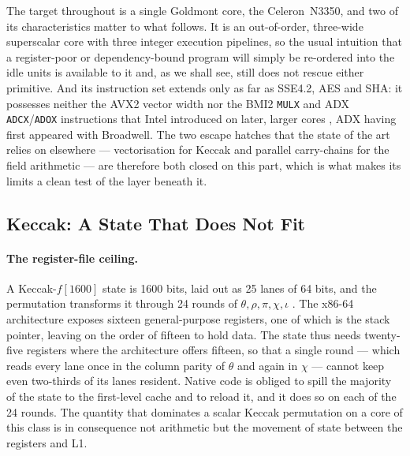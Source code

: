 The target throughout is a single Goldmont core, the \hbox{Celeron~N3350}, and
two of its characteristics matter to what follows. It is an out-of-order,
three-wide superscalar core with three integer execution pipelines, so the usual
intuition that a register-poor or dependency-bound program will simply be
re-ordered into the idle units is available to it and, as we shall see, still
does not rescue either primitive. And its instruction set extends only as far as
SSE4.2, AES and SHA: it possesses neither the AVX2 vector width nor the BMI2
\texttt{MULX} and ADX \texttt{ADCX}/\texttt{ADOX} instructions that Intel
introduced on later, larger cores \cite{intelLargeIntegerArithmetic2012}, ADX
having first appeared with Broadwell. The two escape hatches that the state of
the art relies on elsewhere --- vectorisation for Keccak and parallel
carry-chains for the field arithmetic --- are therefore both closed on this part,
which is what makes its limits a clean test of the layer beneath it.

\subsection{Keccak: A State That Does Not Fit}
\label{sec:challenge-keccak}

\paragraph{The register-file ceiling.}
A Keccak-$f[1600]$ state is 1600 bits, laid out as 25 lanes of 64 bits, and the
permutation transforms it through 24 rounds of $\theta,\rho,\pi,\chi,\iota$
\cite{bertoniKeccakReference2011,technologySHA32015}. The x86-64 architecture exposes
sixteen general-purpose registers, one of which is the stack pointer, leaving on
the order of fifteen to hold data. The state thus needs twenty-five registers
where the architecture offers fifteen, so that a single round --- which reads
every lane once in the column parity of $\theta$ and again in $\chi$ --- cannot
keep even two-thirds of its lanes resident. Native code is obliged to spill the
majority of the state to the first-level cache and to reload it, and it does so on
each of the 24 rounds. The quantity that dominates a scalar Keccak permutation on
a core of this class is in consequence not arithmetic but the movement of state
between the registers and L1.

